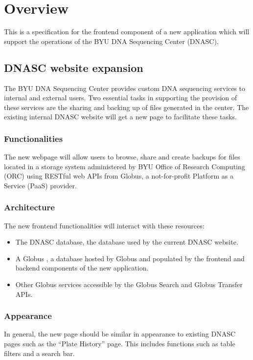 
\section{Overview}

This is a specification for the frontend component of a new application which will
support the operations of the BYU DNA Sequencing Center (DNASC).

\subsection{DNASC website expansion}

The BYU DNA Sequencing Center provides custom DNA sequencing services to internal and 
external users. Two essential tasks in supporting the provision of these services are 
the sharing and backing up of files generated in the center. The existing internal DNASC 
website  will get a new page to facilitate these tasks.

\subsubsection{Functionalities}

The new webpage will allow users to browse, share and create backups for files located in a 
storage system administered by BYU Office of Research Computing (ORC) using RESTful web 
APIs from Globus, a not-for-profit Platform as a Service (PaaS) provider.

\subsubsection{Architecture}

The new frontend functionalities will interact with these resources:
\begin{itemize}
    \item The DNASC database, the database used by the current DNASC website.
    \item A Globus , a database hosted by Globus and populated 
    by the frontend and backend components of the new application.
    \item Other Globus services accessible by the Globus Search and Globus Transfer APIs.
\end{itemize}

\subsubsection{Appearance}
In general, the new page should be similar in appearance to existing DNASC pages such as 
the ``Plate History'' page. This includes functions such as table filters and a search bar. 

